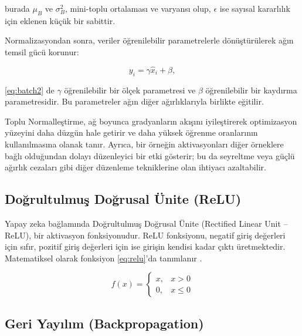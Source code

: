 burada \( \mu_B \) ve \( \sigma_B^2 \), mini-toplu ortalaması ve varyansı olup, \( \epsilon \) ise sayısal kararlılık için eklenen küçük bir sabittir.

Normalizasyondan sonra, veriler öğrenilebilir parametrelerle dönüştürülerek ağın temsil gücü korunur:

\begin{equation}
    y_i = \gamma \widehat{x}_i + \beta,
    \label{eq:batch2}
\end{equation}

\eqref{eq:batch2} de \( \gamma \) öğrenilebilir bir ölçek parametresi ve \( \beta \) öğrenilebilir bir kaydırma parametresidir. Bu parametreler ağın diğer ağırlıklarıyla birlikte eğitilir.

Toplu Normalleştirme, ağ boyunca gradyanların akışını iyileştirerek optimizasyon yüzeyini daha düzgün hale getirir ve daha yüksek öğrenme oranlarının kullanılmasına olanak tanır. Ayrıca, bir örneğin aktivasyonları diğer örneklere bağlı olduğundan dolayı düzenleyici bir etki gösterir; bu da seyreltme veya güçlü ağırlık cezaları gibi diğer düzenleme tekniklerine olan ihtiyacı azaltabilir.

\begin{comment}
    https://www.mathworks.com/help/deeplearning/ref/nnet.cnn.layer.batchnormalizationlayer.html
\end{comment}


\subsection{Doğrultulmuş Doğrusal Ünite (ReLU)}


Yapay zeka bağlamında  Doğrultulmuş Doğrusal Ünite (Rectified Linear Unit – ReLU), bir aktivasyon fonksiyonudur. ReLU fonksiyonu, negatif giriş değerleri için sıfır, pozitif giriş değerleri için ise girişin kendisi kadar çıktı üretmektedir. Matematiksel olarak fonksiyon \eqref{eq:relu}'da tanımlanır \cite{zhang2014improving}. 


\begin{equation}
    f(x) = 
    \begin{cases}  
    x, & x > 0 \\  
    0, & x \leq 0  
    \end{cases}
    \label{eq:relu}
\end{equation}



\subsection{Geri Yayılım (Backpropagation)}

